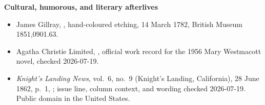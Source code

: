 \textbf{Cultural, humorous, and literary afterlives}
{\footnotesize
\begin{itemize}[itemsep=0em,topsep=0.15em,parsep=0pt]
\item James Gillray, , hand-coloured etching, 14 March 1782, British Museum 1851,0901.63.
\item Agatha Christie Limited, , official work record for the 1956 Mary Westmacott novel, checked 2026-07-19.
\item \emph{Knight's Landing News}, vol.~6, no.~9 (Knight's Landing, California), 28 June 1862, p.~1, ; issue line, column context, and wording checked 2026-07-19. Public domain in the United States.
\end{itemize}}

